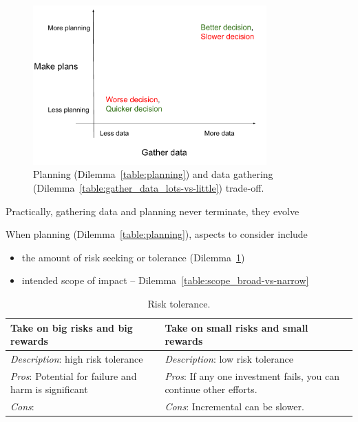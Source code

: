 \begin{figure}[ht]
    \centering
    \includegraphics[width=0.8\textwidth]{images/planning_and_data_gathering.pdf}
    \caption{Planning (Dilemma~\ref{table:planning}) and data gathering (Dilemma~\ref{table:gather_data_lots-vs-little}) trade-off.}
    \label{fig:pareto_frontier}
\end{figure}

Practically, gathering data and planning never terminate, they evolve 




When planning (Dilemma~\ref{table:planning}), aspects to consider include
\begin{itemize}
    \item the amount of risk seeking or tolerance (Dilemma~\ref{table:risk})
    \item intended scope of impact -- Dilemma~\ref{table:scope_broad-vs-narrow}
\end{itemize}

\begin{center}
\begin{table}[ht]
\begin{tabular}{ | m{\dilemmatablewidth}| m{\dilemmatablewidth} | } 
  \hline
  \textbf{Take on big risks and big rewards} & 
  \textbf{Take on small risks and small rewards} \\ 
  \hline
  \textit{Description}: high risk tolerance &
  \textit{Description}: low risk tolerance \\
  \hline
  \textit{Pros}: Potential for failure and harm is significant &
  \textit{Pros}: If any one investment fails, you can continue other efforts. \\
  \hline
  \textit{Cons}:  & 
  \textit{Cons}: Incremental can be slower. \\
  \hline
\end{tabular}
\caption{Risk tolerance. 
}
\label{table:risk}
\end{table}
\end{center}


